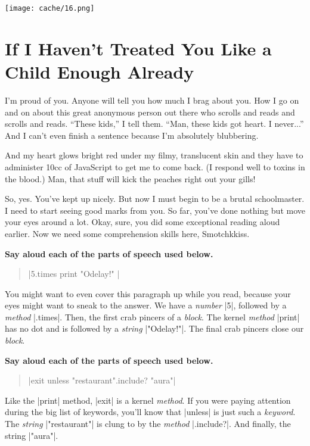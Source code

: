 \documentclass[12pt,twoside]{report}
\begin{document}
	\texttt{[image: cache/16.png]}


\section{If I Haven't Treated You Like a Child Enough Already}


I'm proud of you.  Anyone will tell you how much I brag about you.
How I go on and on about this great anonymous person out there who
scrolls and reads and scrolls and reads.  ``These kids,'' I tell them.
``Man, these kids got heart.  I never...''  And I can't even finish a
sentence because I'm absolutely blubbering.

And my heart glows bright red under my filmy, translucent skin and
they have to administer 10cc of JavaScript to get me to come back.  (I
respond well to toxins in the blood.)  Man, that stuff will kick the
peaches right out your gills!

So, yes.  You've kept up nicely.  But now I must begin to be a brutal
schoolmaster. I need to start seeing good marks from you.  So far,
you've done nothing but move your eyes around a lot.  Okay, sure, you
did some exceptional reading aloud earlier.  Now we need some
comprehension skills here, Smotchkkiss.

{\bf Say aloud each of the parts of speech used below.}

\begin{quote}
\rubyinline|5.times { print "Odelay!" }|\end{quote}


You might want to even cover this paragraph up while you read, because
your eyes might want to sneak to the answer.  We have a {\em number}
\rubyinline|5|, followed by a {\em method}
\rubyinline|.times|.  Then, the first crab pincers of
a {\em block}.  The kernel {\em method}
\rubyinline|print| has no dot and is followed by a
          {\em string} \rubyinline|"Odelay!"|.  The
          final crab pincers close our {\em block}.

{\bf Say aloud each of the parts of speech used below.}

\begin{quote}
\rubyinline|exit unless "restaurant".include? "aura"|\end{quote}


Like the \rubyinline|print| method,
\rubyinline|exit| is a kernel {\em method}.  If you
were paying attention during the big list of keywords, you'll know
that \rubyinline|unless| is just such a {\em keyword}.
The {\em string} \rubyinline|"restaurant"| is clung to
by the {\em method} \rubyinline|.include?|.  And
finally, the string \rubyinline|"aura"|.
\end{document}
